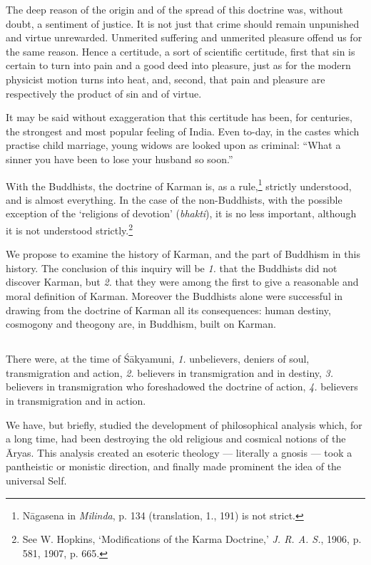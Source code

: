 \documentclass[a4paper, 11pt, oneside, english]{article}
\begin{document}
The deep reason of the origin and of the spread of this doctrine was, without doubt, a sentiment of justice. It is not just that crime should remain unpunished and virtue unrewarded. Unmerited suffering and unmerited pleasure offend us for the same reason. Hence a certitude, a sort of scientific certitude, first that sin is certain to turn into pain and a good deed into pleasure, just as for the modern physicist motion turns into heat, and, second, that pain and pleasure are respectively the product of sin and of virtue.

It may be said without exaggeration that this certitude has been, for centuries, the strongest and most popular feeling of India. Even to-day, in the castes which practise child marriage, young widows are looked upon as criminal: ``What a sinner you have been to lose your husband so soon.''

With the Buddhists, the doctrine of Karman is, as a rule,\footnote{Nāgasena in \emph{Milinda}, p. 134 (translation, 1., 191) is not strict.} strictly understood, and is almost everything. In the case of the non-Buddhists, with the possible exception of the `religions of devotion' (\emph{bhakti}), it is no less important, although it is not understood strictly.\footnote{See W. Hopkins, `Modifications of the Karma Doctrine,' \emph{J. R. A. S.}, 1906, p. 581, 1907, p. 665.}

We propose to examine the history of Karman, and the part of Buddhism in this history. The conclusion of this inquiry will be \emph{1.} that the Buddhists did not discover Karman, but \emph{2.} that they were among the first to give a reasonable and moral definition of Karman. Moreover the Buddhists alone were successful in drawing from the doctrine of Karman all its consequences: human destiny, cosmogony and theogony are, in Buddhism, built on Karman.

\subsection{}
\paragraph{}
There were, at the time of Śākyamuni, \emph{1.} unbelievers, deniers of soul, transmigration and action, \emph{2.} believers in transmigration and in destiny, \emph{3.} believers in transmigration who foreshadowed the doctrine of action, \emph{4.} believers in transmigration and in action.

We have, but briefly, studied the development of philosophical analysis which, for a long time, had been destroying the old religious and cosmical notions of the Āryas. This analysis created an esoteric theology --- literally a gnosis --- took a pantheistic or monistic direction, and finally made prominent the idea of the universal Self.
\end{document}
